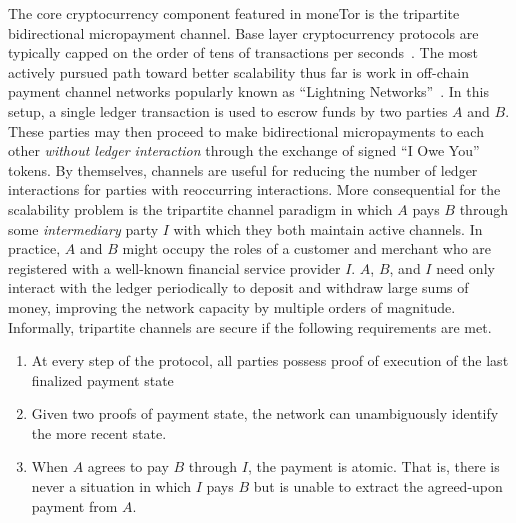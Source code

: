 The core cryptocurrency component featured in moneTor is the tripartite
bidirectional micropayment channel. Base layer cryptocurrency protocols are
typically capped on the order of tens of transactions per
seconds~\cite{team2018blockchain}. The most actively pursued path toward better
scalability thus far is work in off-chain payment channel networks popularly
known as ``Lightning Networks''~\cite{poon2016bitcoin}. In this setup, a single
ledger transaction is used to escrow funds by two parties $A$ and $B$. These
parties may then proceed to make bidirectional micropayments to each other
\emph{without ledger interaction} through the exchange of signed ``I Owe You''
tokens. By themselves, channels are useful for reducing the number of ledger
interactions for parties with reoccurring interactions. More consequential for
the scalability problem is the tripartite channel paradigm in which $A$ pays $B$
through some \emph{intermediary} party $I$ with which they both maintain active
channels. In practice, $A$ and $B$ might occupy the roles of a customer and
merchant who are registered with a well-known financial service provider $I$.
$A$, $B$, and $I$ need only interact with the ledger periodically to deposit and
withdraw large sums of money, improving the network capacity by multiple orders
of magnitude. Informally, tripartite channels are secure if the following
requirements are met.

\begin{enumerate}
\item At every step of the protocol, all parties possess proof of execution of
  the last finalized payment state
\item Given two proofs of payment state, the network can unambiguously identify
  the more recent state.
\item When $A$ agrees to pay $B$ through $I$, the payment is atomic. That is,
  there is never a situation in which $I$ pays $B$ but is unable to extract the
  agreed-upon payment from $A$.
\end{enumerate}



